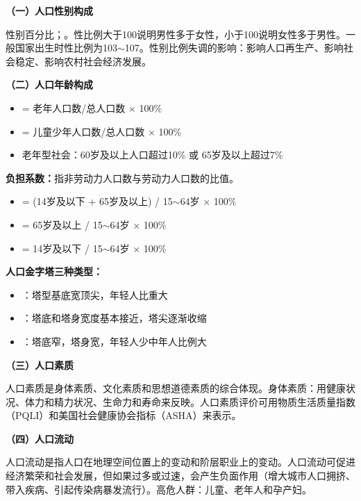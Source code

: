 \begin{keybox}
\textbf{（一）人口性别构成}

性别百分比；。性比例大于100说明男性多于女性，小于100说明女性多于男性。一般国家出生时性比例为103$\sim$107。性别比例失调的影响：影响人口再生产、影响社会稳定、影响农村社会经济发展。

\textbf{（二）人口年龄构成}

\begin{itemize}[leftmargin=*]
    \item {} = 老年人口数/总人口数 × 100\%
    \item {} = 儿童少年人口数/总人口数 × 100\%
    \item 老年型社会：60岁及以上人口超过10\% 或 65岁及以上超过7\%
\end{itemize}

\textbf{负担系数：}指非劳动力人口数与劳动力人口数的比值。
\begin{itemize}[leftmargin=*]
    \item {} = (14岁及以下 + 65岁及以上) / 15$\sim$64岁 × 100\%
    \item {} = 65岁及以上 / 15$\sim$64岁 × 100\%
    \item {} = 14岁及以下 / 15$\sim$64岁 × 100\%
\end{itemize}

\textbf{人口金字塔三种类型：}
\begin{itemize}[leftmargin=*]
    \item {}：塔型基底宽顶尖，年轻人比重大
    \item {}：塔底和塔身宽度基本接近，塔尖逐渐收缩
    \item {}：塔底窄，塔身宽，年轻人少中年人比例大
\end{itemize}

\textbf{（三）人口素质}

人口素质是身体素质、文化素质和思想道德素质的综合体现。身体素质：用健康状况、体力和精力状况、生命力和寿命来反映。人口素质评价可用物质生活质量指数（PQLI）和美国社会健康协会指标（ASHA）来表示。

\textbf{（四）人口流动}

人口流动是指人口在地理空间位置上的变动和阶层职业上的变动。人口流动可促进经济繁荣和社会发展，但如果过多或过速，会产生负面作用（增大城市人口拥挤、带入疾病、引起传染病暴发流行）。高危人群：儿童、老年人和孕产妇。
\end{keybox}

